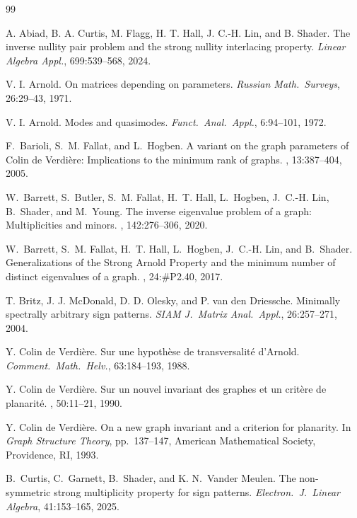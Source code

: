 \documentclass{article}
\theoremstyle{definition}
\begin{document}
\begin{thebibliography}{99}

A. Abiad, B. A. Curtis, M. Flagg, H. T. Hall, J. C.-H. Lin, and B. Shader.
\newblock The inverse nullity pair problem and the strong nullity interlacing property.
\newblock \emph{Linear Algebra Appl.}, 699:539--568, 2024. 

V. I. Arnold. 
\newblock On matrices depending on parameters.
\newblock \emph{Russian Math.\ Surveys}, 26:29--43, 1971. 


V. I. Arnold. 
\newblock Modes and quasimodes.
\newblock \emph{Funct.\ Anal.\ Appl.},  6:94--101, 1972. 

F.~Barioli, S.~M. Fallat, and L.~Hogben.
\newblock A variant on the graph parameters of {C}olin de {V}erdi\`ere: Implications to the minimum rank of graphs.
, 13:387--404, 2005.

W.~Barrett, S.~Butler, S.~M. Fallat, H.~T. Hall, L.~Hogben, J.~C.-H. Lin, B.~Shader, and M.~Young.
\newblock The inverse eigenvalue problem of a graph: {M}ultiplicities and minors.
, 142:276--306, 2020.

W.~Barrett, S.~M. Fallat, H.~T. Hall, L.~Hogben, J.~C.-H. Lin, and B.~Shader.
\newblock Generalizations of the {S}trong {A}rnold {P}roperty and the minimum number of distinct eigenvalues of a graph.
, 24:\#P2.40, 2017.

T. Britz, J. J. McDonald, D. D. Olesky, and P. van den Driessche. 
\newblock Minimally spectrally arbitrary sign patterns.
\newblock \emph{SIAM J.\ Matrix Anal.\ Appl.}, 26:257--271, 2004.

Y. Colin de Verdière.
\newblock Sur une hypothèse de transversalité d'Arnold. 
\newblock \emph{Comment.\ Math.\ Helv.}, 63:184--193, 1988. 

Y. Colin de Verdière.
\newblock Sur un nouvel invariant des graphes et un crit\`ere de planarit\'e.
, 50:11--21, 1990.

Y. Colin de Verdière.
\newblock On a new graph invariant and a criterion for planarity.
\newblock In {\it Graph Structure Theory}, pp.~137--147, American Mathematical Society, Providence, RI, 1993.

B.~Curtis, C.~Garnett, B.~Shader, and K. N.~Vander Meulen.  
\newblock The non-symmetric strong multiplicity property for sign patterns.  
\newblock \emph{Electron.\ J.\ Linear Algebra}, 41:153--165, 2025.


\end{thebibliography}
\end{document}
